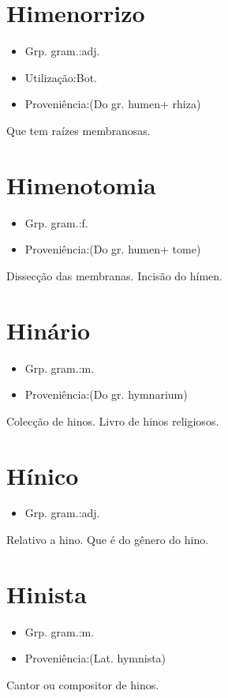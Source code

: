 \documentclass{article}
\begin{document}
\section{Himenorrizo}
\begin{itemize}
\item {Grp. gram.:adj.}
\end{itemize}
\begin{itemize}
\item {Utilização:Bot.}
\end{itemize}
\begin{itemize}
\item {Proveniência:(Do gr. \textunderscore humen\textunderscore  + \textunderscore rhiza\textunderscore )}
\end{itemize}
Que tem raízes membranosas.
\section{Himenotomia}
\begin{itemize}
\item {Grp. gram.:f.}
\end{itemize}
\begin{itemize}
\item {Proveniência:(Do gr. \textunderscore humen\textunderscore  + \textunderscore tome\textunderscore )}
\end{itemize}
Dissecção das membranas.
Incisão do hímen.
\section{Hinário}
\begin{itemize}
\item {Grp. gram.:m.}
\end{itemize}
\begin{itemize}
\item {Proveniência:(Do gr. \textunderscore hymnarium\textunderscore )}
\end{itemize}
Colecção de hinos.
Livro de hinos religiosos.
\section{Hínico}
\begin{itemize}
\item {Grp. gram.:adj.}
\end{itemize}
Relativo a hino.
Que é do gênero do hino.
\section{Hinista}
\begin{itemize}
\item {Grp. gram.:m.}
\end{itemize}
\begin{itemize}
\item {Proveniência:(Lat. \textunderscore hymnista\textunderscore )}
\end{itemize}
Cantor ou compositor de hinos.
\end{document}
